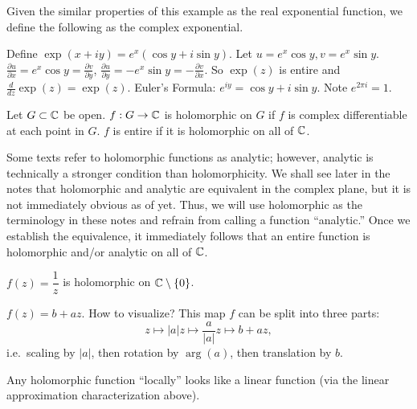 \documentclass[11pt]{article}
\begin{document}
Given the similar properties of this example as the real exponential function, we define the following as the complex exponential.

\begin{definition}
Define $\exp(x+iy) = e^x(\cos y + i \sin y)$.
Let $u = e^x \cos y, v = e^x \sin y$.
$\frac{\partial u}{\partial x} = e^x \cos y = \frac{\partial v}{\partial y}$,
$\frac{\partial u}{\partial y} = -e^x \sin y = -\frac{\partial v}{\partial x}$.
So $\exp(z)$ is entire and $\frac{d}{dz}\exp(z) = \exp(z)$.
Euler's Formula: $e^{iy} = \cos y + i \sin y$. Note $e^{2\pi i} = 1$.
\end{definition}

\begin{definition}
Let $G \subset {\mathbb{C}}$ be open.
$f: G \to {\mathbb{C}}$ is holomorphic on $G$ if $f$ is complex differentiable at each point in $G$.
$f$ is entire if it is holomorphic on all of ${\mathbb{C}}$.
\end{definition}

\begin{remark}
    Some texts refer to holomorphic functions as analytic; however, analytic is technically a stronger condition than holomorphicity. We shall see later in the notes that holomorphic and analytic are equivalent in the complex plane, but it is not immediately obvious as of yet. Thus, we will use holomorphic as the terminology in these notes and refrain from calling a function ``analytic.'' Once we establish the equivalence, it immediately follows that an entire function is holomorphic and/or analytic on all of ${\mathbb{C}}$. 
\end{remark}

\begin{example}
$f(z) = \dfrac{1}{z}$ is holomorphic on ${\mathbb{C}}\setminus\{0\}$.
\end{example}

\begin{example}
$f(z) = b + az$. How to visualize? This map $f$ can be split into three parts:
\[
z \mapsto |a|z \mapsto \frac{a}{|a|}z \mapsto b+az,
\]
i.e.\ scaling by $|a|$, then rotation by $\arg(a)$, then translation by $b$.
\end{example}

\begin{remark}
Any holomorphic function ``locally'' looks like a linear function (via the linear approximation characterization above).
\end{remark}
\end{document}
